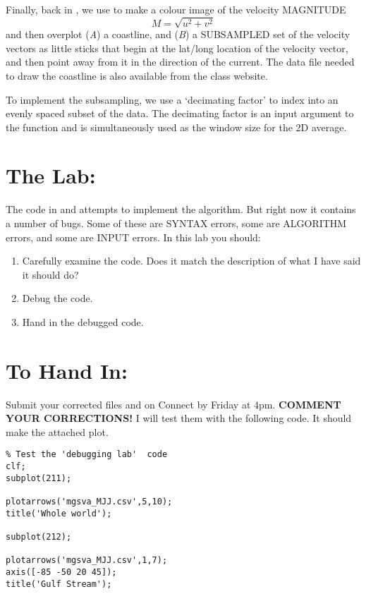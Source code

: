 \documentclass[letterpaper,12pt]{article}
\begin{document}
Finally, back in , we use  to make a colour image of the velocity MAGNITUDE
\begin{equation*}
M=\sqrt{u^2+v^2}
\end{equation*}
and then overplot 
(\emph{A}) a coastline, and (\emph{B}) a SUBSAMPLED set of the velocity vectors as little
sticks that begin at the lat/long location of the velocity vector, and then point
away from it in the direction of the current. The data file  needed to draw the coastline is also available from the class website.

To implement the subsampling, we use a `decimating factor' to index into an evenly spaced subset of the data. The decimating factor  is an input argument to the function  and is simultaneously used as the window size for the 2D average. 

\vspace{-12pt}

\section*{The Lab:}
\vspace{-12pt}

The code in  and  attempts to implement the
algorithm.  But right now it contains a number of
bugs. Some of these are SYNTAX errors, some are ALGORITHM errors, and some are
INPUT errors. In this lab you should:
\begin{enumerate}
\item Carefully examine the code. Does it match the description of what I
have said it should do?
\item Debug the code.
\item Hand in the debugged code.
\end{enumerate}


\section*{To Hand In:}
\vspace{-12pt}

Submit your corrected files  and    on Connect by Friday at 4pm.
{\bf COMMENT YOUR CORRECTIONS!}   I will test them with the following code. It should make 
the attached plot.


\begin{boxedminipage}[h]{6in}
\small
\begin{lstlisting}
% Test the 'debugging lab'  code
clf;
subplot(211);

plotarrows('mgsva_MJJ.csv',5,10);
title('Whole world');

subplot(212);

plotarrows('mgsva_MJJ.csv',1,7);
axis([-85 -50 20 45]);
title('Gulf Stream');
\end{lstlisting}
\end{boxedminipage}
\end{document}
